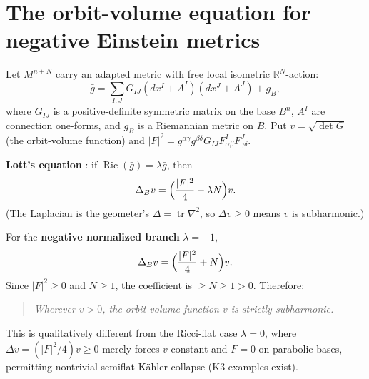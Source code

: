 %
%

\section{The orbit-volume equation for negative Einstein metrics}

Let $M^{n+N}$ carry an adapted metric with free local isometric
$\mathbb R^N$-action:
\[
 \bar g=\sum_{I,J}G_{IJ}(dx^I+A^I)(dx^J+A^J)+g_B,
\]
where $G_{IJ}$ is a positive-definite symmetric matrix on the base $B^n$,
$A^I$ are connection one-forms, and $g_B$ is a Riemannian metric on $B$.
Put $v=\sqrt{\det G}$ (the orbit-volume function) and
$|F|^2=g^{\alpha\gamma}g^{\beta\delta}G_{IJ}F_{\alpha\beta}^I F_{\gamma\delta}^J$.

\textbf{Lott's equation} \cite[eq.\ (2.9)]{Lott2020}:
if $\operatorname{Ric}(\bar g)=\lambda\bar g$, then
\begin{equation}\label{eq:lott}
 \Delta_B v=\Bigl(\frac{|F|^2}{4}-\lambda N\Bigr)v.
\end{equation}
(The Laplacian is the geometer's $\Delta=\operatorname{tr}\nabla^2$, so
$\Delta v\ge0$ means $v$ is subharmonic.)

For the \textbf{negative normalized branch} $\lambda=-1$,
\begin{equation}\label{eq:negein}
 \Delta_B v=\Bigl(\frac{|F|^2}{4}+N\Bigr)v.
\end{equation}
Since $|F|^2\ge0$ and $N\ge1$, the coefficient is
$\ge N\ge1>0$.  Therefore:
\begin{quote}
\emph{Wherever $v>0$, the orbit-volume function $v$ is strictly
subharmonic.}
\end{quote}

This is qualitatively different from the Ricci-flat case $\lambda=0$,
where $\Delta v=(|F|^2/4)v\ge0$ merely forces $v$ constant and $F=0$
on parabolic bases, permitting nontrivial semiflat K\"ahler collapse
(K3 examples exist).

